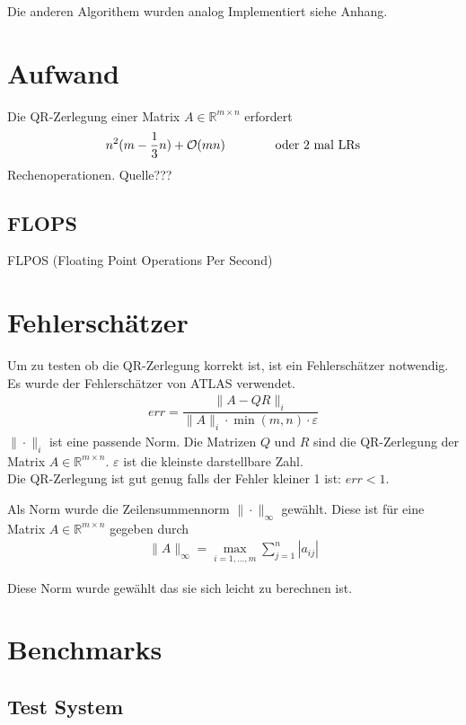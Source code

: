 Die anderen Algorithem wurden analog Implementiert siehe Anhang.


\section{Aufwand}

Die QR-Zerlegung einer Matrix $A \in \mathbb{R}^{m \times n}$  erfordert
\begin{align*}
	n^2(m-\frac{1}{3} n) + {\cal O}(mn) \qquad \qquad \text{oder 2 mal LRs}
\end{align*}
Rechenoperationen. Quelle???

\subsection{FLOPS}
FLPOS (Floating Point Operations Per Second) 

\section{Fehlerschätzer}

Um zu testen ob die QR-Zerlegung korrekt ist, ist ein Fehlerschätzer notwendig.
Es wurde der Fehlerschätzer von ATLAS\cite{atlas} verwendet.
\begin{align}
	err = \dfrac{\|A - QR\|_i}{\|A\|_i \cdot \min(m,n) \cdot \varepsilon}
\end{align}
$\|\cdot\|_i$ ist eine passende Norm.
Die Matrizen $Q$ und $R$ sind die QR-Zerlegung der Matrix $A \in \mathbb{R}^{m \times n}$.
$\varepsilon$ ist die kleinste darstellbare Zahl.\\
Die QR-Zerlegung ist gut genug falls der Fehler kleiner 1 ist: $ err < 1 $.

Als Norm wurde die Zeilensummennorm $\|\cdot\|_\infty$ gewählt.
Diese ist für eine Matrix $A \in \mathbb{R}^{m\times n}$ gegeben durch
\begin{align*}
	\|A\|_\infty = \max_{i=1,...,m} \sum_{j=1}^{n} |a_{ij}|
\end{align*}

Diese Norm wurde gewählt das sie sich leicht zu berechnen ist.




\section{Benchmarks}

\subsection{Test System}

